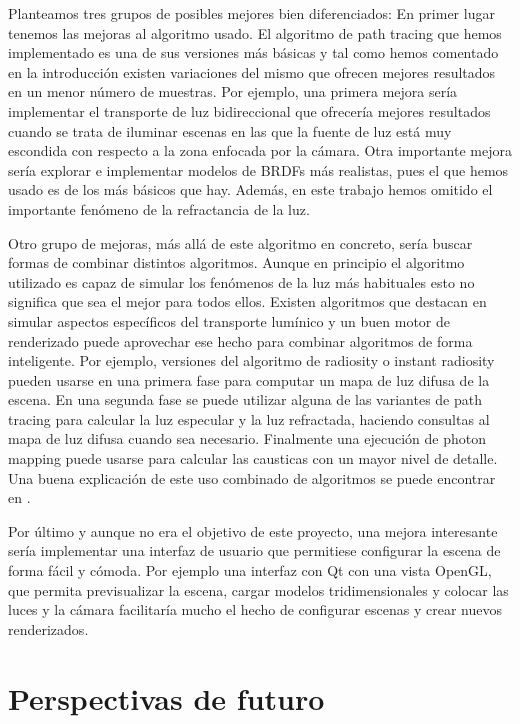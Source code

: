 Planteamos tres grupos de posibles mejores bien diferenciados: En primer lugar tenemos las mejoras al algoritmo usado. El algoritmo de path tracing que hemos implementado es una de sus versiones más básicas y tal como hemos comentado en la introducción existen variaciones del mismo que ofrecen mejores resultados en un menor número de muestras. Por ejemplo, una primera mejora sería implementar el transporte de luz bidireccional que ofrecería mejores resultados cuando se trata de iluminar escenas en las que la fuente de luz está muy escondida con respecto a la zona enfocada por la cámara. Otra importante mejora sería explorar e implementar modelos de BRDFs más realistas, pues el que hemos usado es de los más básicos que hay. Además, en este trabajo hemos omitido el importante fenómeno de la refractancia de la luz.

\medskip

Otro grupo de mejoras, más allá de este algoritmo en concreto, sería buscar formas de combinar distintos algoritmos. Aunque en principio el algoritmo utilizado es capaz de simular los fenómenos de la luz más habituales esto no significa que sea el mejor para todos ellos. Existen algoritmos que destacan en simular aspectos específicos del transporte lumínico y un buen motor de renderizado puede aprovechar ese hecho para combinar algoritmos de forma inteligente. Por ejemplo, versiones del algoritmo de radiosity o instant radiosity pueden usarse en una primera fase para computar un mapa de luz difusa de la escena. En una segunda fase se puede utilizar alguna de las variantes de path tracing para calcular la luz especular y la luz refractada, haciendo consultas al mapa de luz difusa cuando sea necesario. Finalmente una ejecución de photon mapping puede usarse para calcular las causticas con un mayor nivel de detalle.
Una buena explicación de este uso combinado de algoritmos se puede encontrar en \cite{Hery2013}.

\medskip

Por último y aunque no era el objetivo de este proyecto, una mejora interesante sería implementar una interfaz de usuario que permitiese configurar la escena de forma fácil y cómoda. Por ejemplo una interfaz con Qt con una vista OpenGL, que permita previsualizar la escena, cargar modelos tridimensionales y colocar las luces y la cámara facilitaría mucho el hecho de configurar escenas y crear nuevos renderizados.

\clearpage

\section{Perspectivas de futuro}

